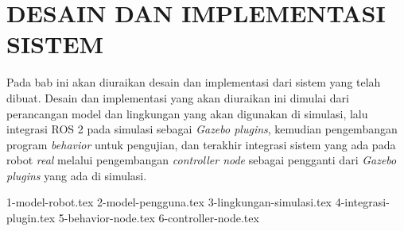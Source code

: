 \chapter{DESAIN DAN IMPLEMENTASI SISTEM}
\label{chap:desainimplementasi}

Pada bab ini akan diuraikan desain dan implementasi dari sistem yang telah dibuat.
Desain dan implementasi yang akan diuraikan ini dimulai dari perancangan model dan lingkungan yang akan digunakan di simulasi,
  lalu integrasi ROS 2 pada simulasi sebagai \emph{Gazebo plugins},
  kemudian pengembangan program \emph{behavior} untuk pengujian,
  dan terakhir integrasi sistem yang ada pada robot \emph{real} melalui pengembangan \emph{controller node} sebagai pengganti dari \emph{Gazebo plugins} yang ada di simulasi.

{1-model-robot.tex}
{2-model-pengguna.tex}
{3-lingkungan-simulasi.tex}
{4-integrasi-plugin.tex}
{5-behavior-node.tex}
{6-controller-node.tex}
